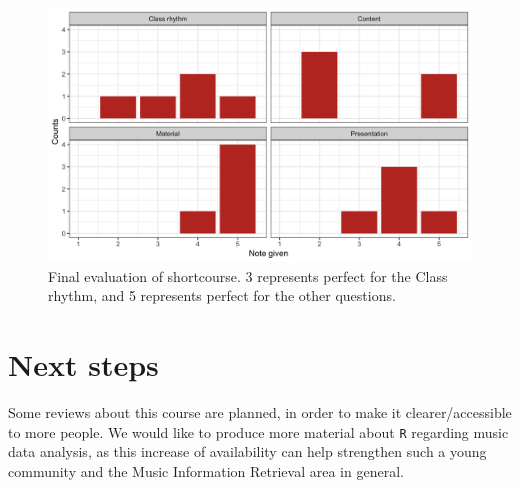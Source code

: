 \begin{figure}[ht]
  \centering
  \includegraphics[width=13cm, heigth=22cm]{results.png}
  \caption{Final evaluation of shortcourse. 3 represents perfect for the Class rhythm, and 5 represents perfect for the other questions. }
  \label{figure:rlogo}
\end{figure}


\section{Next steps}

Some reviews about this course are planned, 
in order to make it clearer/accessible to more people. 
We would like to produce more material about 
\texttt{R} regarding music data 
analysis, as this increase of availability 
can help strengthen such a young community and
the Music Information Retrieval area in general. 






\address{Bruna Wundervald\\
  Maynooth University, Maynooth, Ireland\\
  }

